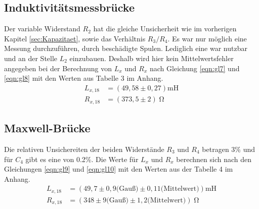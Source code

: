\subsection{Induktivitätsmessbrücke}
\label{sec:Induktiv}
Der variable Widerstand $R_2$ hat die gleiche Unsicherheit wie im vorherigen Kapitel \ref{sec:Kapazitaet}, sowie das Verhältnis $R_3/R_4$.
Es war nur möglich eine Messung durchzuführen, durch beschädigte Spulen.
Lediglich eine war nutzbar und an der Stelle $L_2$ einzubauen.
Deshalb wird hier kein Mittelwertsfehler angegeben bei der Berechnung von $L_x$ und $R_x$ nach Gleichung \eqref{eqn:gl7} und \eqref{eqn:gl8} mit den Werten aus Tabelle 3 im Anhang.
\begin{align*}
  L_{x,18} &= (49,58 \pm 0,27) \textrm{mH} \\
  R_{x,18} &= (373,5 \pm 2) \upOmega
\end{align*}

\subsection{Maxwell-Brücke}
\label{sec:Maxwell}
Die relativen Unsichereiten der beiden Widerstände $R_3$ und $R_4$ betragen 3\% und für $C_4$ gibt es eine von 0.2\%.
Die Werte für $L_x$ und $R_x$ berechnen sich nach den Gleichungen \eqref{eqn:gl9} und \eqref{eqn:gl10} mit den Werten aus der Tabelle 4 im Anhang.
\begin{align*}
  L_{x,18} &= (49,7 \pm 0,9 \textrm{(Gauß)} \pm 0,11 \textrm{(Mittelwert)}) \textrm{mH} \\
  R_{x,18} &= (348 \pm 9 \textrm{(Gauß)} \pm 1,2 \textrm{(Mittelwert)}) \upOmega
\end{align*}

